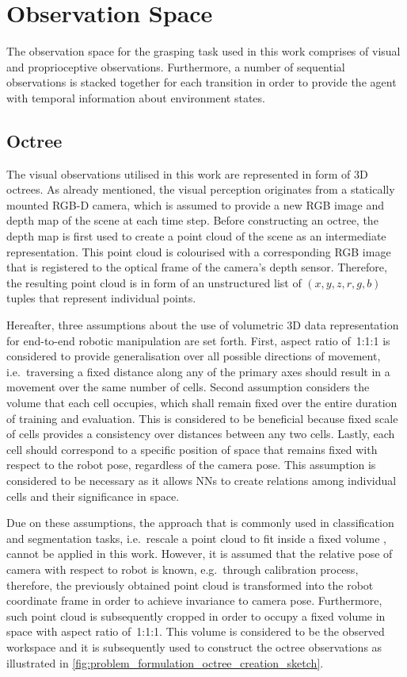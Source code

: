 \section{Observation Space}

The observation space for the grasping task used in this work comprises of visual and proprioceptive observations. Furthermore, a number of sequential observations is stacked together for each transition in order to provide the agent with temporal information about environment states.


\subsection{Octree}

The visual observations utilised in this work are represented in form of 3D octrees. As already mentioned, the visual perception originates from a statically mounted RGB-D camera, which is assumed to provide a new RGB image and depth map of the scene at each time step. Before constructing an octree, the depth map is first used to create a point cloud of the scene as an intermediate representation. This point cloud is colourised with a corresponding RGB image that is registered to the optical frame of the camera's depth sensor. Therefore, the resulting point cloud is in form of an unstructured list of \((x,y,z,r,g,b)\) tuples that represent individual points.

Hereafter, three assumptions about the use of volumetric 3D data representation for end-to-end robotic manipulation are set forth. First, aspect ratio of~1:1:1 is considered to provide generalisation over all possible directions of movement, i.e.~traversing a fixed distance along any of the primary axes should result in a movement over the same number of cells. Second assumption considers the volume that each cell occupies, which shall remain fixed over the entire duration of training and evaluation. This is considered to be beneficial because fixed scale of cells provides a consistency over distances between any two cells. Lastly, each cell should correspond to a specific position of space that remains fixed with respect to the robot pose, regardless of the camera pose. This assumption is considered to be necessary as it allows NNs to create relations among individual cells and their significance in space.

Due on these assumptions, the approach that is commonly used in classification and segmentation tasks, i.e.~rescale a point cloud to fit inside a fixed volume \cite{wang_o-cnn_2017}, cannot be applied in this work. However, it is assumed that the relative pose of camera with respect to robot is known, e.g.~through calibration process, therefore, the previously obtained point cloud is transformed into the robot coordinate frame in order to achieve invariance to camera pose. Furthermore, such point cloud is subsequently cropped in order to occupy a fixed volume in space with aspect ratio of~1:1:1. This volume is considered to be the observed workspace and it is subsequently used to construct the octree observations as illustrated in \autoref{fig:problem_formulation_octree_creation_sketch}. 

